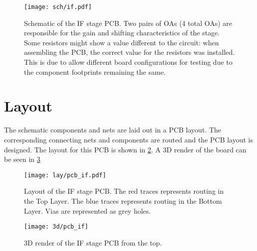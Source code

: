 \begin{figure}[h]
	\centering
	\texttt{[image: sch/if.pdf]}
	\caption{Schematic of the IF stage PCB. Two pairs of OAs (4 total OAs) are responsible for the gain and shifting characteristics of the stage. Some resistors might show a value different to the circuit: when assembling the PCB, the correct value for the resistors was installed. This is due to allow different board configurations for testing due to the component footprints remaining the same.}
	\label{fig:sch_if}
\end{figure}

\section{Layout}

The schematic components and nets are laid out in a PCB layout. The corresponding connecting nets and components are routed and the PCB layout is designed. The layout for this PCB is shown in \cref{fig:lay_if}. A 3D render of the board can be seen in \cref{fig:lay_if_3d}

\begin{figure}[h]
	\centering
	\texttt{[image: lay/pcb\_if.pdf]}
	\caption{Layout of the IF stage PCB. The red traces represents routing in the Top Layer. The blue traces represents routing in the Bottom Layer. Vias are represented as grey holes.}
	\label{fig:lay_if}
\end{figure}

\begin{figure}[h]
	\centering
	\texttt{[image: 3d/pcb\_if]}
	\caption{3D render of the IF stage PCB from the top.}
	\label{fig:lay_if_3d}
\end{figure}


